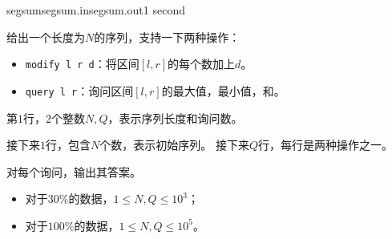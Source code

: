 \documentclass[11pt,a4paper,oneside]{article}
\begin{document}
\begin{problem}{segsum}{segsum.in}{segsum.out}{1 second} 
    
    给出一个长度为$N$的序列，支持一下两种操作：
    \begin{itemize}
    	\item \texttt{modify l r d}：将区间$[l,r]$的每个数加上$d$。
    	\item \texttt{query l r}：询问区间$[l,r]$的最大值，最小值，和。
    \end{itemize}

    \InputFile

    第$1$行，$2$个整数$N, Q$，表示序列长度和询问数。

	接下来$1$行，包含$N$个数，表示初始序列。
    接下来$Q$行，每行是两种操作之一。

    \OutputFile

    对每个询问，输出其答案。

    \Example

    \begin{example}
    \end{example}

    \Note
    
    \begin{itemize}
    	\item 对于$30\%$的数据，$1 \leq N, Q \leq 10^3$；
        \item 对于$100\%$的数据，$1 \leq N, Q \leq 10^5$。
    \end{itemize}

\end{problem}
\end{document}
